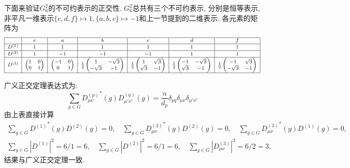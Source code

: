 \documentclass[UTF8]{ctexart}
\begin{document}
下面来验证$G_6^2$的不可约表示的正交性. $G_6^2$总共有三个不可约表示, 分别是恒等表示, 非平凡一维表示$\{e, d, f\} \mapsto 1, \{a, b, c\} \mapsto -1$和上一节提到的二维表示. 各元素的矩阵为
\begin{equation}\footnotesize
  \begin{array}{|c|c|c|c|c|c|c|}
   \hline
     & e & a & b & c & d & f \\
   \hline
   D^{(1)} & 1 & 1 & 1 & 1 & 1 & 1\\
   \hline
   D^{(2)} & 1 & -1 & -1 & -1 & 1 & 1\\
   \hline
   D^{(3)} &
   \begin{pmatrix}
     1 & 0 \\
     0 & 1
   \end{pmatrix} &
   \begin{pmatrix}
     -1 & 0 \\
     0 & 1
   \end{pmatrix} & \frac{1}{2}
   \begin{pmatrix}
     1 & -\sqrt{3} \\
     -\sqrt{3} & -1
   \end{pmatrix} & \frac{1}{2}
   \begin{pmatrix}
     1 & \sqrt{3} \\
     \sqrt{3} & -1
   \end{pmatrix} & \frac{1}{2}
   \begin{pmatrix}
     -1 & -\sqrt{3} \\
     \sqrt{3} & -1
   \end{pmatrix} & \frac{1}{2}
   \begin{pmatrix}
     -1 & \sqrt{3} \\
     -\sqrt{3} & -1
   \end{pmatrix}\\
   \hline
  \end{array}
\end{equation}

广义正交定理表达式为:
\begin{equation}
  \sum_{g \in G} {D_{\mu \nu}^{(p)}}^{*} (g) D_{\mu' \nu'}^{(q)} (g) = \frac{n}{d_p} \delta_{pq} \delta_{\mu \nu} \delta_{\mu' \nu'}
\end{equation}
由上表直接计算
\begin{gather}
  \sum_{g \in G} {D^{(1)}}^{*} (g) D^{(2)} (g) = 0,\quad \sum_{g \in G} {D^{(3)}_{\mu \nu}}^{*} (g) D^{(2)} (g) = 0,\quad \sum_{g \in G} {D^{(3)}_{\mu \nu}}^{*} (g) D^{(1)} (g) = 0, \\
  \sum_{g \in G} |D^{(1)}|^2 = 6 / 1 = 6,\quad \sum_{g \in G} |D^{(2)}|^2 = 6 / 1 = 6,\quad \sum_{g \in G} |D^{(3)}_{\mu \nu}|^2 = 6 / 2 = 3, 
\end{gather}
结果与广义正交定理一致.
\end{document}
